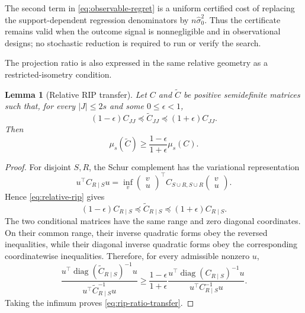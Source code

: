\documentclass[a4paper,11pt,english]{article}
\newtheorem{lemma}[theorem]{Lemma}
\begin{document}
The second term in \eqref{eq:observable-regret} is a uniform certified
cost of replacing the support-dependent regression denominators by
$n\hat\sigma_0^2$.  Thus the certificate remains valid when the outcome
signal is nonnegligible and in observational designs; no stochastic
reduction is required to run or verify the search.

The projection ratio is also expressed in the same relative geometry as a
restricted-isometry condition.

\begin{lemma}[Relative RIP transfer]
\label{lem:rip-transfer}
Let $C$ and $\widetilde C$ be positive semidefinite matrices such that,
for every $|J|\le2s$ and some $0\le\epsilon<1$,
\begin{equation}\label{eq:relative-rip}
        (1-\epsilon)C_{JJ}
        \preceq\widetilde C_{JJ}
        \preceq(1+\epsilon)C_{JJ}.
\end{equation}
Then
\begin{equation}\label{eq:rip-ratio-transfer}
        \mu_s(\widetilde C)
        \ge\frac{1-\epsilon}{1+\epsilon}\mu_s(C).
\end{equation}
\end{lemma}

\begin{proof}
For disjoint $S,R$, the Schur complement has the variational
representation
\begin{equation*}
        u^\top C_{R\mid S}u
        =\inf_v
        \begin{pmatrix}v\\u\end{pmatrix}^{\!\top}
        C_{S\cup R,S\cup R}
        \begin{pmatrix}v\\u\end{pmatrix}.
\end{equation*}
Hence \eqref{eq:relative-rip} gives
\begin{equation*}
        (1-\epsilon)C_{R\mid S}
        \preceq\widetilde C_{R\mid S}
        \preceq(1+\epsilon)C_{R\mid S}.
\end{equation*}
The two conditional matrices have the same range and zero diagonal
coordinates.  On their common range, their inverse quadratic forms obey
the reversed inequalities, while their diagonal inverse quadratic forms
obey the corresponding coordinatewise inequalities.  Therefore, for
every admissible nonzero $u$,
\begin{equation*}
        \frac{u^\top
        \operatorname{diag}(\widetilde C_{R\mid S})^{-1}u}
        {u^\top\widetilde C_{R\mid S}^{-1}u}
        \ge\frac{1-\epsilon}{1+\epsilon}
        \frac{u^\top\operatorname{diag}(C_{R\mid S})^{-1}u}
        {u^\top C_{R\mid S}^{-1}u}.
\end{equation*}
Taking the infimum proves \eqref{eq:rip-ratio-transfer}.
\end{proof}
\end{document}
